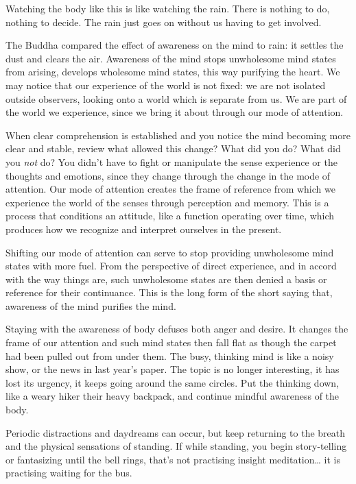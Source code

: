 Watching the body like this is like watching the rain. There is nothing
to do, nothing to decide. The rain just goes on without us having to get
involved.


The Buddha compared the effect of awareness on the mind to rain: it
settles the dust and clears the air. Awareness of the mind stops
unwholesome mind states from arising, develops wholesome mind states,
this way purifying the heart. We may notice that our experience of the
world is not fixed: we are not isolated outside observers, looking onto
a world which is separate from us. We are part of the world we
experience, since we bring it about through our mode of attention.

When clear comprehension is established and you notice the mind becoming
more clear and stable, review what allowed this change? What did you do?
What did you \emph{not} do? You didn't have to fight or manipulate the
sense experience or the thoughts and emotions, since they change through
the change in the mode of attention. Our mode of attention creates the
frame of reference from which we experience the world of the senses
through perception and memory. This is a process that conditions an
attitude, like a function operating over time, which produces how we
recognize and interpret ourselves in the present.

Shifting our mode of attention can serve to stop providing unwholesome
mind states with more fuel. From the perspective of direct experience,
and in accord with the way things are, such unwholesome states are then
denied a basis or reference for their continuance. This is the long form
of the short saying that, awareness of the mind purifies the mind.

Staying with the awareness of body defuses both anger and desire. It
changes the frame of our attention and such mind states then fall flat
as though the carpet had been pulled out from under them. The busy,
thinking mind is like a noisy show, or the news in last year's paper.
The topic is no longer interesting, it has lost its urgency, it keeps
going around the same circles. Put the thinking down, like a weary hiker
their heavy backpack, and continue mindful awareness of the body.

\enlargethispage*{2\baselineskip}

Periodic distractions and daydreams can occur, but keep returning to the
breath and the physical sensations of standing. If while standing, you
begin story-telling or fantasizing until the bell rings, that's not
practising insight meditation\ldots{} it is practising waiting for the
bus.


